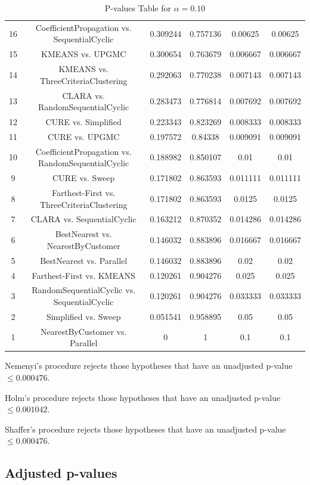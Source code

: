 \documentclass[a4paper,10pt]{article}
\begin{document}
\begin{landscape}
\begin{table}[!htp]
\begin{tabular}{cccccc}
16&CoefficientPropagation vs. SequentialCyclic&0.309244&0.757136&0.00625&0.00625\\
15&KMEANS vs. UPGMC&0.300654&0.763679&0.006667&0.006667\\
14&KMEANS vs. ThreeCriteriaClustering&0.292063&0.770238&0.007143&0.007143\\
13&CLARA vs. RandomSequentialCyclic&0.283473&0.776814&0.007692&0.007692\\
12&CURE vs. Simplified&0.223343&0.823269&0.008333&0.008333\\
11&CURE vs. UPGMC&0.197572&0.84338&0.009091&0.009091\\
10&CoefficientPropagation vs. RandomSequentialCyclic&0.188982&0.850107&0.01&0.01\\
9&CURE vs. Sweep&0.171802&0.863593&0.011111&0.011111\\
8&Farthest-First vs. ThreeCriteriaClustering&0.171802&0.863593&0.0125&0.0125\\
7&CLARA vs. SequentialCyclic&0.163212&0.870352&0.014286&0.014286\\
6&BestNearest vs. NearestByCustomer&0.146032&0.883896&0.016667&0.016667\\
5&BestNearest vs. Parallel&0.146032&0.883896&0.02&0.02\\
4&Farthest-First vs. KMEANS&0.120261&0.904276&0.025&0.025\\
3&RandomSequentialCyclic vs. SequentialCyclic&0.120261&0.904276&0.033333&0.033333\\
2&Simplified vs. Sweep&0.051541&0.958895&0.05&0.05\\
1&NearestByCustomer vs. Parallel&0&1&0.1&0.1\\
\hline
\end{tabular}
\caption{P-values Table for $\alpha=0.10$}
\end{table}Nemenyi's procedure rejects those hypotheses that have an unadjusted p-value $\le0.000476$.

Holm's procedure rejects those hypotheses that have an unadjusted p-value $\le0.001042$.

Shaffer's procedure rejects those hypotheses that have an unadjusted p-value $\le0.000476$.

\pagebreak

\subsection{Adjusted p-values}


\end{landscape}
\end{document}
